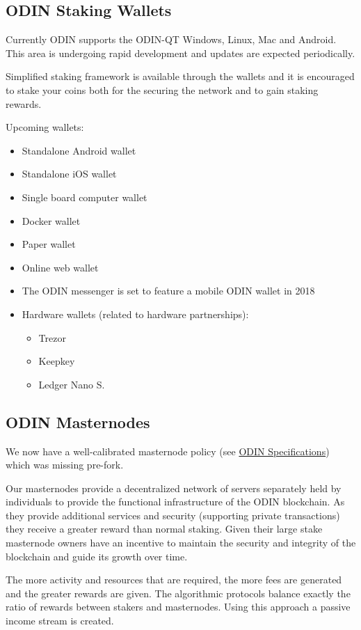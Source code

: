 \subsection{ODIN Staking Wallets}
Currently ODIN supports the ODIN-QT Windows, Linux, Mac and Android. This area is undergoing rapid development and updates are expected periodically.

Simplified staking framework is available through the wallets and it is encouraged to stake your coins both for the securing the network and to gain staking rewards.

Upcoming wallets:
\begin{itemize}
   \item Standalone Android wallet
   \item Standalone iOS wallet
   \item Single board computer wallet
   \item Docker wallet
   \item Paper wallet
   \item Online web wallet
   \item The ODIN messenger is set to feature a mobile ODIN wallet in 2018
   \item Hardware wallets (related to hardware partnerships):
   \begin{itemize}
      \item Trezor
      \item Keepkey
      \item Ledger Nano S.
   \end{itemize}
\end{itemize}

\subsection{​ODIN Masternodes}
We now have a well-calibrated masternode policy (see \hyperlink{specifications}{ODIN Specifications}) which was missing pre-fork.  

Our masternodes provide a decentralized network of servers separately held by individuals to provide the functional infrastructure of the ODIN blockchain.  As they provide additional services and security (supporting private transactions) they receive a greater reward than normal staking.   Given their large stake masternode owners have an incentive to maintain the security and integrity of the blockchain and guide its growth over time.

The more activity and resources that are required, the more fees are generated and the greater rewards are given. The algorithmic protocols balance exactly the ratio of rewards between stakers and masternodes. Using this approach a passive income stream is created.

